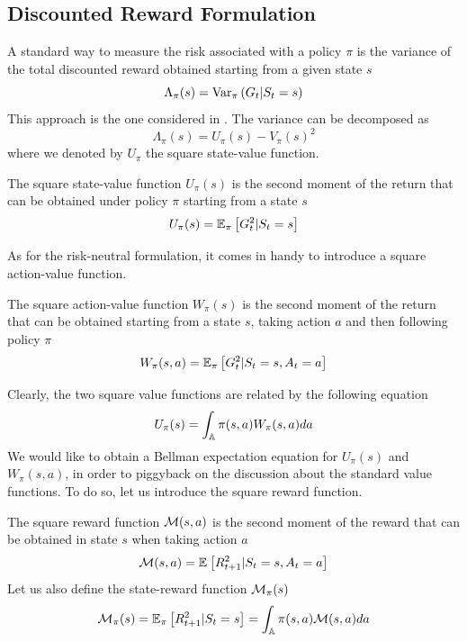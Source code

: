 \subsection{Discounted Reward Formulation}
A standard way to measure the risk associated with a policy $\pi$ is the variance of the total discounted reward obtained starting from a given state $s$
\begin{equation}
	\Lambda_\pi(s) = \Var[\pi]{G_t | S_t = s}
\end{equation}
This approach is the one considered in \cite{sobel1982variance}. The variance can be decomposed as 
\begin{equation}
	\label{eq:variance_decomposition}
	\Lambda_\pi(s) = U_\pi(s) - V_\pi(s)^2
\end{equation}
where we denoted by $U_\pi$ the square state-value function.
\begin{definition}
	The square state-value function $U_\pi(s)$ is the second moment of the return that can be obtained under policy $\pi$ starting from a state $s$ 
	\begin{equation}
		U_\pi(s) = \E[\pi]{G_t^2 | S_t = s}
	\end{equation}
\end{definition}
As for the risk-neutral formulation, it comes in handy to introduce a square action-value function.
\begin{definition}
	The square action-value function $W_\pi(s)$ is the second moment of the return that can be obtained starting from a state $s$, taking action $a$ and then following policy $\pi$
	\begin{equation}
		W_\pi(s, a) = \E[\pi]{G_t^2 | S_t = s, A_t = a}
	\end{equation}
\end{definition}
Clearly, the two square value functions are related by the following equation
\begin{equation}
	U_\pi(s) = \int_{\A} \pi(s,a) W_\pi(s,a) da
\end{equation}
We would like to obtain a Bellman expectation equation for $U_\pi(s)$ and $W_\pi(s,a)$, in order to piggyback on the discussion about the standard value functions. To do so, let us introduce the square reward function.
\begin{definition}
	The square reward function $\calM(s,a)$ is the second moment of the reward that can be obtained in state $s$ when taking action $a$
	\begin{equation}
		\calM(s,a) = \E{R_{t+1}^2 | S_t = s, A_t = a}
	\end{equation}
	Let us also define the state-reward function $\calM_\pi(s)$ 
	\begin{equation}
		\calM_\pi(s) = \E[\pi]{R_{t+1}^2|S_t = s} = \int_\A \pi(s,a) \calM(s,a) da
	\end{equation}
\end{definition}
